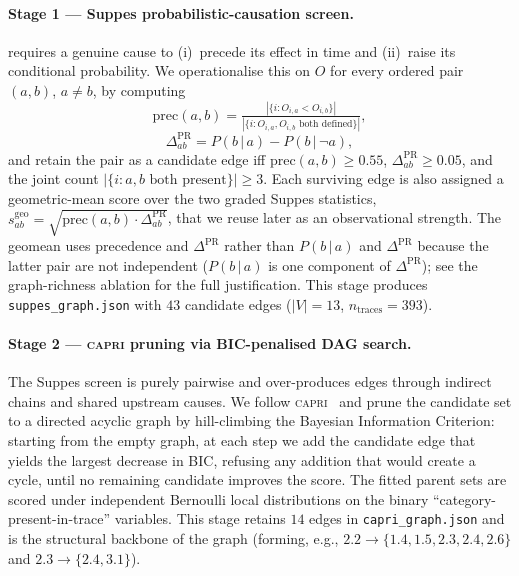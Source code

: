 \paragraph{Stage 1 — Suppes probabilistic-causation screen.}
\citet{suppes1970probabilistic} requires a genuine cause to (i)~precede
its effect in time and (ii)~raise its conditional probability. We
operationalise this on $O$ for every ordered pair
$(a,b)$, $a\!\neq\!b$, by computing
\begin{equation*}
\mathrm{prec}(a,b) \!=\! \tfrac{|\{i: O_{i,a}{<}O_{i,b}\}|}
{|\{i: O_{i,a},O_{i,b} \text{ both defined}\}|},
\end{equation*}
\begin{equation*}
\Delta^{\mathrm{PR}}_{ab} \!=\! P(b\,|\,a) - P(b\,|\,\neg a),
\end{equation*}
and retain the pair as a candidate edge iff
$\mathrm{prec}(a,b)\geq 0.55$, $\Delta^{\mathrm{PR}}_{ab}\geq 0.05$, and
the joint count $|\{i: a,b \text{ both present}\}|\geq 3$. Each surviving
edge is also assigned a geometric-mean score over the two graded Suppes
statistics,
$s^{\mathrm{geo}}_{ab}=\sqrt{\mathrm{prec}(a,b)\cdot \Delta^{\mathrm{PR}}_{ab}}$,
that we reuse later as an observational strength. The geomean uses
precedence and $\Delta^{\mathrm{PR}}$ rather than $P(b\,|\,a)$ and
$\Delta^{\mathrm{PR}}$ because the latter pair are not independent
($P(b\,|\,a)$ is one component of $\Delta^{\mathrm{PR}}$); see the
graph-richness ablation for the full justification. This stage produces
\texttt{suppes\_graph.json} with $43$ candidate edges
($|V|{=}13$, $n_{\mathrm{traces}}{=}393$).

\paragraph{Stage 2 — \textsc{capri} pruning via BIC-penalised DAG search.}
The Suppes screen is purely pairwise and over-produces edges through
indirect chains and shared upstream causes. We follow
\textsc{capri}~\citep{ramazzotti2017capri,bonchi2016capri} and prune the
candidate set to a directed acyclic graph by hill-climbing the Bayesian
Information Criterion: starting from the empty graph, at each step we
add the candidate edge that yields the largest decrease in BIC, refusing
any addition that would create a cycle, until no remaining candidate
improves the score. The fitted parent sets are scored under independent
Bernoulli local distributions on the binary
``category-present-in-trace'' variables. This stage retains $14$ edges
in \texttt{capri\_graph.json} and is the structural backbone of the
graph (forming, e.g.,
$2.2 \!\to\! \{1.4, 1.5, 2.3, 2.4, 2.6\}$ and
$2.3 \!\to\! \{2.4, 3.1\}$).

